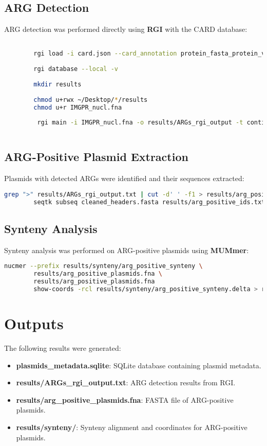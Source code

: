 \documentclass[a4paper,12pt]{report}
\begin{document}
	\subsection*{ARG Detection}
	ARG detection was performed directly using \textbf{RGI} with the CARD database:
	\begin{lstlisting}[language=bash]

		rgi load -i card.json --card_annotation protein_fasta_protein_variant_model.fasta --local
		
		rgi database --local -v
		
		mkdir results 
		
		chmod u+rwx ~/Desktop/*/results
		chmod u+r IMGPR_nucl.fna
		
		 rgi main -i IMGPR_nucl.fna -o results/ARGs_rgi_output -t contig --local --clean -n 4
		


	\end{lstlisting}
	
	\subsection*{ARG-Positive Plasmid Extraction}
	Plasmids with detected ARGs were identified and their sequences extracted:
	\begin{lstlisting}[language=bash]
		grep ">" results/ARGs_rgi_output.txt | cut -d' ' -f1 > results/arg_positive_ids.txt
		seqtk subseq cleaned_headers.fasta results/arg_positive_ids.txt > results/arg_positive_plasmids.fna
	\end{lstlisting}
	
	\subsection*{Synteny Analysis}
	Synteny analysis was performed on ARG-positive plasmids using \textbf{MUMmer}:
	\begin{lstlisting}[language=bash]
		nucmer --prefix results/synteny/arg_positive_synteny \
		results/arg_positive_plasmids.fna \
		results/arg_positive_plasmids.fna
		show-coords -rcl results/synteny/arg_positive_synteny.delta > results/synteny/arg_positive_synteny.coords
	\end{lstlisting}
	
	\section*{Outputs}
	The following results were generated:
	\begin{itemize}
		\item \textbf{plasmids\_metadata.sqlite}: SQLite database containing plasmid metadata.
		\item \textbf{results/ARGs\_rgi\_output.txt}: ARG detection results from RGI.
		\item \textbf{results/arg\_positive\_plasmids.fna}: FASTA file of ARG-positive plasmids.
		\item \textbf{results/synteny/}: Synteny alignment and coordinates for ARG-positive plasmids.
	\end{itemize}
	
\end{document}
